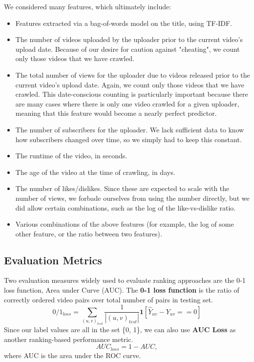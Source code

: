 		We considered many features, which ultimately include:
		\begin{itemize}
			\item
			Features extracted via a bag-of-words model on the title, using TF-IDF.
			\item
			The number of videos uploaded by the uploader prior to the current video's upload date.  Because of our desire for caution against "cheating", we count only those videos that we have crawled.
			\item
			The total number of views for the uploader due to videos released prior to the current video's upload date.  Again, we count only those videos that we have crawled.  This date-conscious counting is particularly important because there are many cases where there is only one video crawled for a given uploader, meaning that this feature would become a nearly perfect predictor.
			\item
			The number of subscribers for the uploader.  We lack sufficient data to know how subscribers changed over time, so we simply had to keep this constant.
			\item
			The runtime of the video, in seconds.
			\item
			The age of the video at the time of crawling, in days.
			\item
			The number of likes/dislikes.  Since these are expected to scale with the number of views, we forbade ourselves from using the number directly, but we did allow certain combinations, such as the log of the like-vs-dislike ratio.
			\item
			Various combinations of the above features (for example, the log of some other feature, or the ratio between two features).
		\end{itemize}
	
\subsection{Evaluation Metrics}
	Two evaluation measures widely used to evaluate ranking approaches are the 0-1 loss function, Area under Curve (AUC). The \textbf{0-1 loss function} is the ratio of correctly ordered video pairs over total number of pairs in testing set.
	\begin{equation}
		0/1_{loss} = \sum_{(u, v)_{test}} \frac{1}{|(u,v)_{test}|} \textbf{1}[\hat{Y}_{uv} - Y_{uv} == 0]
	\end{equation}
	Since our label values are all in the set \{0, 1\}, we can also use  \textbf{AUC Loss} as another ranking-based performance metric.
	\begin{equation}
		AUC_{loss} = 1 - AUC,
	\end{equation}
	where AUC is the area under the ROC curve.
